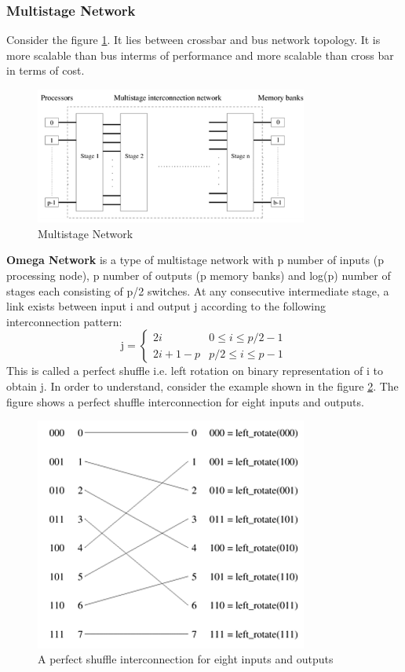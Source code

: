 \documentclass[12pt]{article}
\begin{document}
\subsubsection{Multistage Network}
Consider the figure \ref{fig:multistage}. It lies between crossbar and bus network topology.
It is more scalable than bus interms of performance and more scalable than cross bar in terms of cost.
\begin{figure}[H]
    \centering
    \includegraphics[width=0.8\textwidth]{images/multistage.png}
    \caption{Multistage Network}
    \label{fig:multistage}
\end{figure}
\textbf{Omega Network} is a type of multistage network with p number of inputs (p processing node), 
p number of outputs (p memory banks) and log(p) number of stages each consisting of p/2 switches. At any consecutive intermediate stage, 
a link exists between input i and output j according to the following interconnection pattern:
\begin{equation}
    \text{j} = 
    \begin{cases}
        2i & 0\leq i\leq p/2-1 \\
        2i+1-p & p/2\leq i\leq p-1
    \end{cases}
\end{equation}
This is called a perfect shuffle i.e. left rotation on binary representation of i to obtain j.
In order to understand, consider the example shown in the figure \ref{fig:shuffle}. The figure shows a perfect shuffle interconnection for eight inputs and outputs.
\begin{figure}[H]
    \centering
    \includegraphics[width=0.8\textwidth]{images/shuffle.png}
    \caption{A perfect shuffle interconnection for eight inputs and outputs}
    \label{fig:shuffle}
\end{figure}
\end{document}
